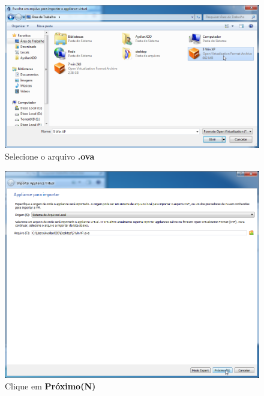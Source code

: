 \documentclass[10pt]{article}
\begin{document}
\begin{figure}[H]
    \centering
    \caption{Selecione o arquivo \textbf{.ova}}
    \label{fig:33}
    \includegraphics[width=\linewidth]{images/ativacao_das_maquinas_virtuais/003.png}
\end{figure}
\begin{figure}[H]
    \centering
    \caption{Clique em \textbf{Próximo(N)}}
    \label{fig:34}
    \includegraphics[width=\linewidth]{images/ativacao_das_maquinas_virtuais/004.png}
\end{figure}
\end{document}
